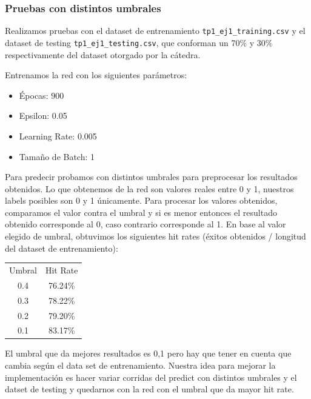 
\subsubsection{Pruebas con distintos umbrales}

Realizamos pruebas con el dataset de entrenamiento \texttt{tp1\_ej1\_training.csv} y el dataset de testing \texttt{tp1\_ej1\_testing.csv}, que conforman un 70$\%$ y 30$\%$ respectivamente del dataset otorgado por la cátedra.

Entrenamos la red con los siguientes parámetros:

\begin{itemize}
\item Épocas: 900 
\item Epsilon: 0.05 
\item Learning Rate: 0.005
\item Tamaño de Batch: 1 
\end{itemize}


Para predecir probamos con distintos umbrales para preprocesar los resultados obtenidos. Lo que obtenemos de la red son valores reales entre 0 y 1, nuestros labels posibles son 0 y 1 únicamente.
Para procesar los valores obtenidos, comparamos el valor contra el umbral y si es menor entonces el resultado obtenido corresponde al 0, caso contrario corresponde al 1. En base al valor elegido de umbral,
obtuvimos los siguientes hit rates (éxitos obtenidos / longitud del dataset de entrenamiento):

\begin{center}
\begin{tabular}{ | c | c | }
  Umbral & Hit Rate \\
  0.4 & 76.24\% \\
  0.3 & 78.22\% \\
  0.2 & 79.20\% \\
  0.1 & 83.17\% \\
\end{tabular}
\end{center}

El umbral que da mejores resultados es 0,1 pero hay que tener en cuenta que cambia según el data set de entrenamiento. Nuestra idea para mejorar la implementación es hacer variar corridas del predict con 
distintos umbrales y el datset de testing y quedarnos con la red con el umbral que da mayor hit rate.








